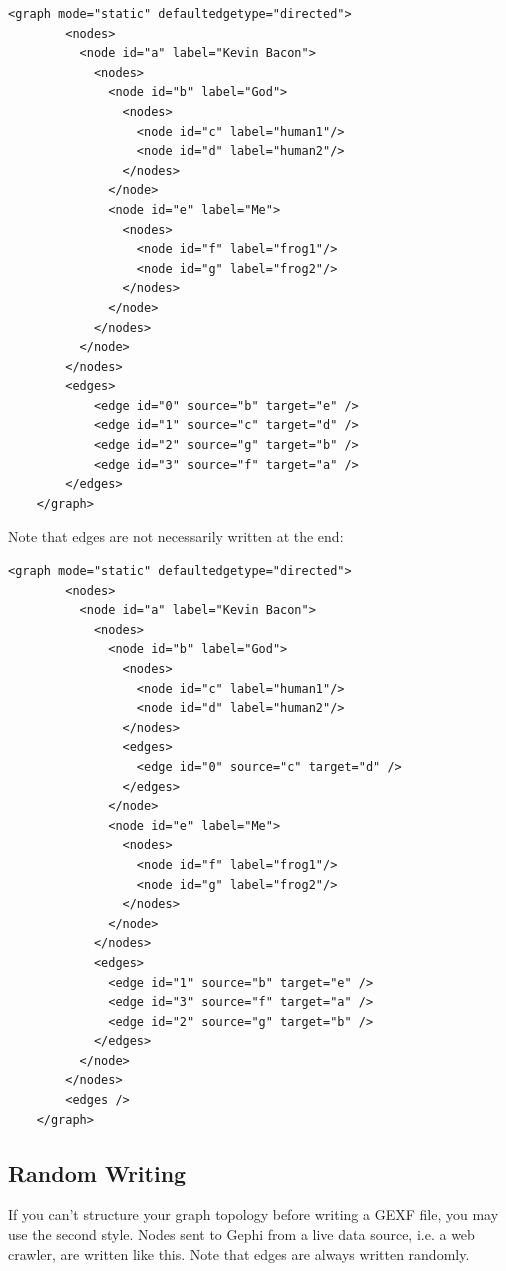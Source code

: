 \documentclass[a4paper,10pt]{article}
\begin{document}
\lstset{ style=gexf }
\begin{lstlisting}[caption={First way},label=hierarchy1]
    <graph mode="static" defaultedgetype="directed">
        <nodes>
          <node id="a" label="Kevin Bacon">
            <nodes>
              <node id="b" label="God">
                <nodes>
                  <node id="c" label="human1"/>
                  <node id="d" label="human2"/>
                </nodes>
              </node>
              <node id="e" label="Me">
                <nodes>
                  <node id="f" label="frog1"/>
                  <node id="g" label="frog2"/>
                </nodes>
              </node>
            </nodes>
          </node>
        </nodes>
        <edges>
            <edge id="0" source="b" target="e" />
            <edge id="1" source="c" target="d" />
            <edge id="2" source="g" target="b" />
            <edge id="3" source="f" target="a" />
        </edges>
    </graph>
\end{lstlisting}

Note that edges are not necessarily written at the end:
\lstset{ style=gexf }
\begin{lstlisting}[caption={First way with edges inside clusters},label=hierarchy11]
    <graph mode="static" defaultedgetype="directed">
        <nodes>
          <node id="a" label="Kevin Bacon">
            <nodes>
              <node id="b" label="God">
                <nodes>
                  <node id="c" label="human1"/>
                  <node id="d" label="human2"/>
                </nodes>
                <edges>
                  <edge id="0" source="c" target="d" />
                </edges>
              </node>
              <node id="e" label="Me">
                <nodes>
                  <node id="f" label="frog1"/>
                  <node id="g" label="frog2"/>
                </nodes>
              </node>
            </nodes>
            <edges>
              <edge id="1" source="b" target="e" />
              <edge id="3" source="f" target="a" />
              <edge id="2" source="g" target="b" />
            </edges>
          </node>
        </nodes>
        <edges />
    </graph>
\end{lstlisting}

\subsection{Random Writing}

If you can't structure your graph topology before writing a GEXF file, you may use the second style. Nodes sent to Gephi from a live data source, i.e. a web crawler, are written like this. Note that edges are always written randomly.
\end{document}
